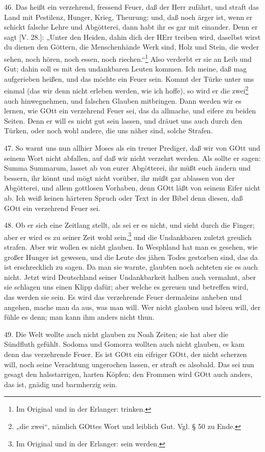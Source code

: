 46. Das heißt ein verzehrend, fressend Feuer, daß der Herr zufährt, und straft das Land mit Pestilenz, Hunger, Krieg, Theurung; und, daß noch ärger ist, wenn er schickt falsche Lehre und Abgötterei, dann habt ihr es gar mit einander. Denn er sagt [V. 28.]: „Unter den Heiden, dahin dich der HErr treiben wird, daselbst wirst du dienen den Göttern, die Menschenhände Werk sind, Holz und Stein, die weder sehen, noch hören, noch essen, noch riechen.“\footnote{Im Original und in der Erlanger: trinken.} Also verderbt er sie an Leib und Gut; dahin soll es mit den undankbaren Leuten kommen. Ich meine, daß mag aufgerieben heißen, und das möchte ein Feuer sein. Kommt der Türke unter uns einmal (das wir denn nicht erleben werden, wie ich hoffe), so wird er die zwei\footnote{„die zwei“, nämlich GOttes Wort und leiblich Gut. Vgl. § 50 zu Ende.} auch
hinwegnehmen, und falschen Glauben mitbringen. Dann werden wir es lernen, wie GOtt ein verzehrend Feuer sei, das da allmache, und eifere zu beiden Seiten. Denn er will es nicht gut sein lassen, und dräuet uns auch durch den Türken, oder noch wohl andere, die uns näher sind, solche Strafen.

47. So warnt uns nun allhier Moses als ein treuer Prediger, daß wir von GOtt und seinem Wort nicht abfallen, auf daß wir nicht verzehrt werden. Als sollte er sagen: Summa Summarum, lasset ab von eurer Abgötterei, ihr müßt euch ändern und bessern, ihr könnt und mögt nicht vorüber, ihr müßt gar ablassen von der Abgötterei, und allem gottlosen Vorhaben, denn GOtt läßt von seinem Eifer nicht ab. Ich weiß keinen härteren Spruch oder Text in der Bibel denn diesen, daß GOtt ein verzehrend Feuer sei.

48. Ob er sich eine Zeitlang stellt, als sei er es nicht, und sieht durch die Finger; aber er wird es zu seiner Zeit wohl sein,\footnote{Im Original und in der Erlanger: sein werden.} und die Undankbaren zuletzt greulich strafen. Aber wir wollen es nicht glauben. In Wesphland hat man es gesehen, wie großer Hunger ist gewesen, und die Leute des jähen Todes gestorben sind, das da ist erschrecklich zu sagen. Da man sie warnte, glaubten noch achteten sie es auch nicht. Jetzt wird Deutschland seiner Undankbarkeit halben auch vermahnt, aber sie schlagen uns einen Klipp dafür; aber welche es gereuen und betreffen wird, das werden sie sein. Es wird das verzehrende Feuer dermaleins anheben und angehen, mache man da aus, was man will. Wer nicht glauben und hören will, der fühle es denn; man kann ihm anders nicht thun.

49. Die Welt wollte auch nicht glauben zu Noah Zeiten; sie hat aber die Sündfluth gefühlt. Sodoma und Gomorra wollten auch nicht glauben, es kam denn das verzehrende Feuer. Es ist GOtt ein eifriger GOtt, der nicht scherzen will, noch seine Verachtung ungerochen lassen, er straft es alsobald. Das sei nun gesagt den halsstarrigen, harten Köpfen; den Frommen wird GOtt auch anders, das ist, gnädig und barmherzig sein.

